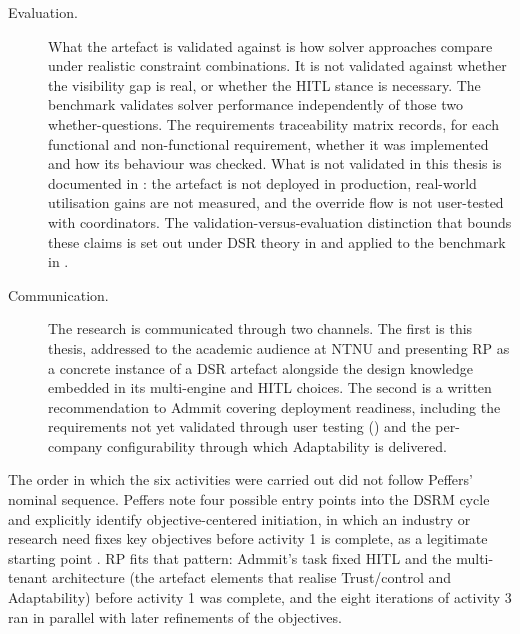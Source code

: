 \begin{description}
  \item[Evaluation.] What the artefact is validated against is how solver approaches compare under realistic constraint combinations. It is not validated against whether the visibility gap is real, or whether the HITL stance is necessary. The benchmark validates solver performance independently of those two whether-questions. The requirements traceability matrix records, for each functional and non-functional requirement, whether it was implemented and how its behaviour was checked. What is not validated in this thesis is documented in : the artefact is not deployed in production, real-world utilisation gains are not measured, and the override flow is not user-tested with coordinators. The validation-versus-evaluation distinction that bounds these claims is set out under DSR theory in  and applied to the benchmark in .
  \item[Communication.] The research is communicated through two channels. The first is this thesis, addressed to the academic audience at NTNU and presenting RP as a concrete instance of a DSR artefact alongside the design knowledge embedded in its multi-engine and HITL choices. The second is a written recommendation to Admmit covering deployment readiness, including the requirements not yet validated through user testing () and the per-company configurability through which Adaptability is delivered.
\end{description}

The order in which the six activities were carried out did not follow Peffers' nominal sequence. Peffers note four possible entry points into the DSRM cycle and explicitly identify objective-centered initiation, in which an industry or research need fixes key objectives before activity 1 is complete, as a legitimate starting point \parencite[p.~56]{peffers2007dsrm}. RP fits that pattern: Admmit's task fixed HITL and the multi-tenant architecture (the artefact elements that realise Trust/control and Adaptability) before activity 1 was complete, and the eight iterations of activity 3 ran in parallel with later refinements of the objectives.


